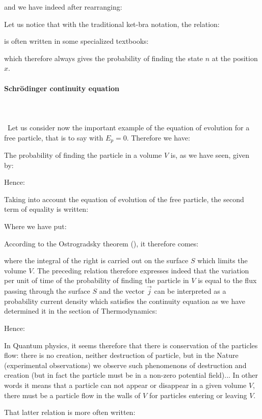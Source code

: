	and we have indeed after rearranging:
	
	Let us notice that with the traditional ket-bra notation, the relation:
	
	is often written in some specialized textbooks:
	
	which therefore always gives the probability of finding the state $n$ at the position $x$.
	
	\pagebreak
	\paragraph{Schrödinger continuity equation}\mbox{}\\\\\
	Let us consider now the important example of the equation of evolution for a free particle, that is to say with $E_p=0$. Therefore we have:
	
	The probability of finding the particle in a volume $V$ is, as we have seen, given by:
	
	Hence:
	
	Taking into account the equation of evolution of the free particle, the second term of equality is written:
	
	Where we have put:
	
	According to the Ostrogradsky theorem (), it therefore comes:
	
	where the integral of the right is carried out on the surface $S$ which limits the volume $V$. The preceding relation therefore expresses indeed that the variation per unit of time of the probability of finding the particle in $V$ is equal to the flux passing through the surface $S$ and the vector $\vec{j}$ can be interpreted as a probability current density which satisfies the continuity equation as we have determined it in the section of Thermodynamics:
	
	Hence:
	
	In Quantum physics, it seems therefore that there is conservation of the particles flow: there is no creation, neither destruction of particle, but in the Nature (experimental observations) we observe such phenomenons of destruction and creation (but in fact the particle must be in a non-zero potential field)... In other words it means that a particle can not appear or disappear in a given volume $V$, there must be a particle flow in the walls of $V$ for particles entering or leaving $V$.
	
	That latter relation is more often written:
	
